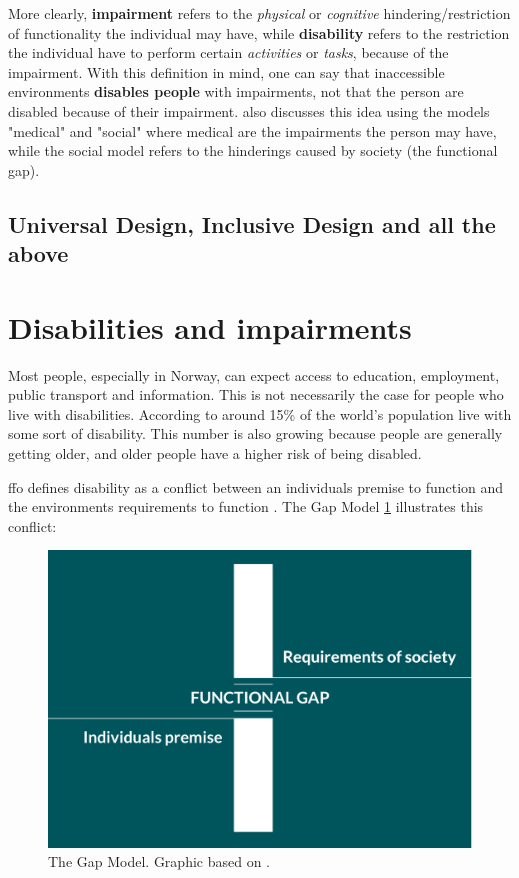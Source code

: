 More clearly, \textbf{impairment} refers to the \textit{physical} or \textit{cognitive} hindering/restriction of functionality the individual may have, while \textbf{disability} refers to the restriction the individual have to perform certain \textit{activities} or \textit{tasks}, because of the impairment. With this definition in mind, one can say that inaccessible environments \textbf{disables people} with impairments, not that the person are disabled because of their impairment. \textcite{world_health_organization_world_2011} also discusses this idea using the models "medical" and "social" where medical are the impairments the person may have, while the social model refers to the hinderings caused by society (the functional gap).

\subsection{Universal Design, Inclusive Design and all the above}

\iffalse
    \section{Disabilities and impairments}
    Most people, especially in Norway, can expect access to education, employment, public transport and information. This is not necessarily the case for people who live with disabilities. According to \textcite{world_health_organization_world_2011} around 15\% of the world's population live with some sort of disability. This number is also growing because people are generally getting older, and older people have a higher risk of being disabled. 
    
    \acrfull{ffo} defines disability as a conflict between an individuals premise to function and the environments requirements to function \parencite{funksjonshemmedes_fellesorganisasjon_ffo_definisjon_2013}. The Gap Model \ref{fig:gap_model} illustrates this conflict: 
    \begin{figure}[H]
      \includegraphics[width=\linewidth]{img/gapmodel.png}
      \caption{The Gap Model. Graphic based on \textcite{difi_kvifor_2016}.}\label{fig:gap_model}
    \endminipage\hfill
    \end{figure}
    
